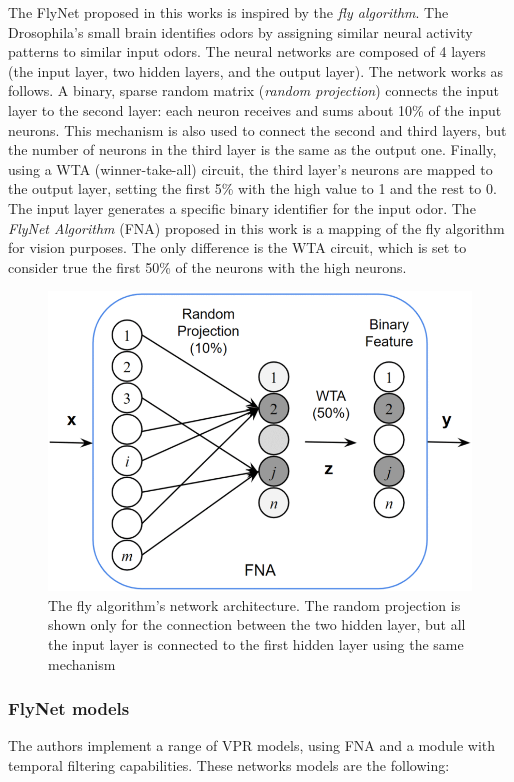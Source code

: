 The FlyNet proposed in this works is inspired by the \emph{fly
algorithm}. The Drosophila's small brain identifies odors by assigning
similar neural activity patterns to similar input odors. The neural
networks are composed of 4 layers (the input layer, two hidden layers,
and the output layer). The network works as follows. A binary, sparse
random matrix (\emph{random projection}) connects the input layer to the
second layer: each neuron receives and sums about 10\% of the input
neurons. This mechanism is also used to connect the second and third
layers, but the number of neurons in the third layer is the same as the
output one. Finally, using a WTA (winner-take-all) circuit, the third
layer's neurons are mapped to the output layer, setting the first 5\%
with the high value to 1 and the rest to 0. The input layer generates a
specific binary identifier for the input odor. The \emph{FlyNet
Algorithm} (FNA) proposed in this work is a mapping of the fly algorithm
for vision purposes. The only difference is the WTA circuit, which is
set to consider true the first 50\% of the neurons with the high
neurons.

\begin{figure}[h!]
\centering
\includegraphics[width=0.7\linewidth]{images/fly.png}
\caption{The fly algorithm's network architecture. The random projection is shown only for the connection between the two hidden layer, but all the input layer is connected to the first hidden layer using the same mechanism}
\end{figure}

\subsubsection{FlyNet models}\label{header-n193}

The authors implement a range of VPR models, using FNA and a module with
temporal filtering capabilities. These networks models are the
following:

